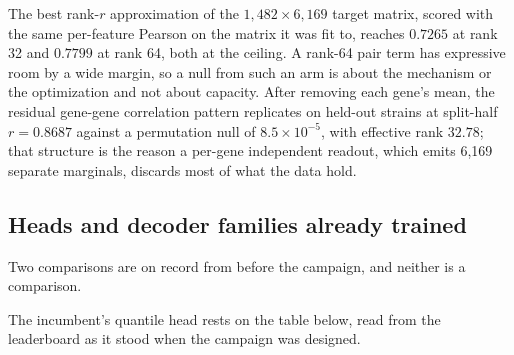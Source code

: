  The best rank-$r$ approximation of the
$1{,}482 \times 6{,}169$ target matrix, scored with the same per-feature Pearson on the
matrix it was fit to, reaches $0.7265$ at rank 32 and $0.7799$ at rank 64, both at the
ceiling. A rank-64 pair term has expressive room by a wide margin, so a null from such an
arm is about the mechanism or the optimization and not about capacity. After removing each
gene's mean, the residual gene-gene correlation pattern replicates on held-out strains at
split-half $r = 0.8687$ against a permutation null of $8.5 \times 10^{-5}$, with effective
rank $32.78$; that structure is the reason a per-gene independent readout, which emits
6{,}169 separate marginals, discards most of what the data hold.

\subsection{Heads and decoder families already trained}
\label{sec:strand-heads}

Two comparisons are on record from before the campaign, and neither is a comparison.

 The incumbent's
quantile head rests on the table below, read from the leaderboard as it stood when the
campaign was designed.

